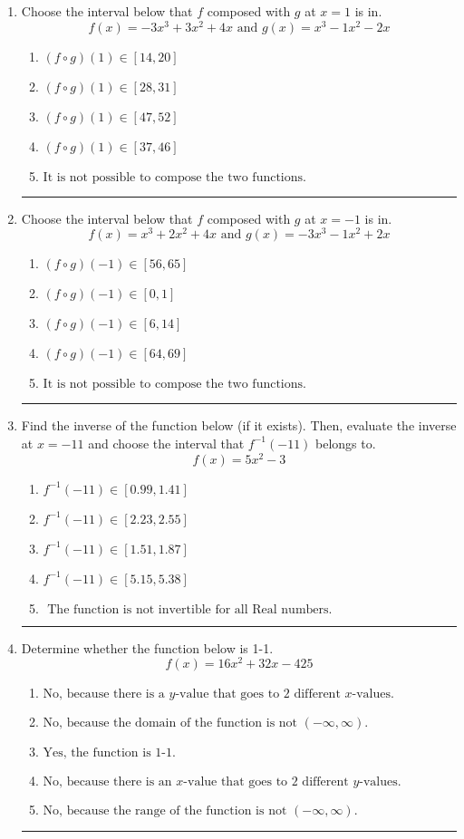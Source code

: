 \documentclass[14pt]{extbook}
\newcommand{\litem}[1]{\item#1\hspace*{-1cm}\rule{\textwidth}{0.4pt}}
\begin{document}
\begin{enumerate}
{\begin{enumerate}[label=\Alph*.]
\end{enumerate} }
\litem{
Choose the interval below that $f$ composed with $g$ at $x=1$ is in.\[ f(x) = -3x^{3} +3 x^{2} +4 x \text{ and } g(x) = x^{3} -1 x^{2} -2 x \]\begin{enumerate}[label=\Alph*.]
\item \( (f \circ g)(1) \in [14, 20] \)
\item \( (f \circ g)(1) \in [28, 31] \)
\item \( (f \circ g)(1) \in [47, 52] \)
\item \( (f \circ g)(1) \in [37, 46] \)
\item \( \text{It is not possible to compose the two functions.} \)

\end{enumerate} }
\litem{
Choose the interval below that $f$ composed with $g$ at $x=-1$ is in.\[ f(x) = x^{3} +2 x^{2} +4 x \text{ and } g(x) = -3x^{3} -1 x^{2} +2 x \]\begin{enumerate}[label=\Alph*.]
\item \( (f \circ g)(-1) \in [56, 65] \)
\item \( (f \circ g)(-1) \in [0, 1] \)
\item \( (f \circ g)(-1) \in [6, 14] \)
\item \( (f \circ g)(-1) \in [64, 69] \)
\item \( \text{It is not possible to compose the two functions.} \)

\end{enumerate} }
\litem{
Find the inverse of the function below (if it exists). Then, evaluate the inverse at $x = -11$ and choose the interval that $f^{-1}(-11)$ belongs to.\[ f(x) = 5 x^2 - 3 \]\begin{enumerate}[label=\Alph*.]
\item \( f^{-1}(-11) \in [0.99, 1.41] \)
\item \( f^{-1}(-11) \in [2.23, 2.55] \)
\item \( f^{-1}(-11) \in [1.51, 1.87] \)
\item \( f^{-1}(-11) \in [5.15, 5.38] \)
\item \( \text{ The function is not invertible for all Real numbers. } \)

\end{enumerate} }
\litem{
Determine whether the function below is 1-1.\[ f(x) = 16 x^2 + 32 x - 425 \]\begin{enumerate}[label=\Alph*.]
\item \( \text{No, because there is a $y$-value that goes to 2 different $x$-values.} \)
\item \( \text{No, because the domain of the function is not $(-\infty, \infty)$.} \)
\item \( \text{Yes, the function is 1-1.} \)
\item \( \text{No, because there is an $x$-value that goes to 2 different $y$-values.} \)
\item \( \text{No, because the range of the function is not $(-\infty, \infty)$.} \)


\end{enumerate}}
\end{enumerate}
\end{document}
